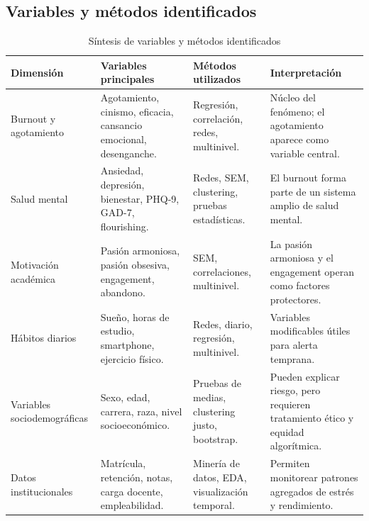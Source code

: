 \documentclass[12pt,a4paper]{article}
\renewcommand{\arraystretch}{1.12}
\begin{document}
\subsection{Variables y métodos identificados}

\begin{table}[H]
\centering
\caption{Síntesis de variables y métodos identificados}
\label{tab:variables_metodos}
\renewcommand{\arraystretch}{1.15}
\scriptsize

\begin{tabularx}{\textwidth}{|
>{\raggedright\arraybackslash}p{}|
>{\raggedright\arraybackslash}p{}|
>{\raggedright\arraybackslash}p{}|
>{\raggedright\arraybackslash}X|}
\hline

\textbf{Dimensión} &
\textbf{Variables principales} &
\textbf{Métodos utilizados} &
\textbf{Interpretación} \\
\hline

Burnout y agotamiento &
Agotamiento, cinismo, eficacia, cansancio emocional, desenganche. &
Regresión, correlación, redes, multinivel. &
Núcleo del fenómeno; el agotamiento aparece como variable central. \\
\hline

Salud mental &
Ansiedad, depresión, bienestar, PHQ-9, GAD-7, flourishing. &
Redes, SEM, clustering, pruebas estadísticas. &
El burnout forma parte de un sistema amplio de salud mental. \\
\hline

Motivación académica &
Pasión armoniosa, pasión obsesiva, engagement, abandono. &
SEM, correlaciones, multinivel. &
La pasión armoniosa y el engagement operan como factores protectores. \\
\hline

Hábitos diarios &
Sueño, horas de estudio, smartphone, ejercicio físico. &
Redes, diario, regresión, multinivel. &
Variables modificables útiles para alerta temprana. \\
\hline

Variables sociodemográficas &
Sexo, edad, carrera, raza, nivel socioeconómico. &
Pruebas de medias, clustering justo, bootstrap. &
Pueden explicar riesgo, pero requieren tratamiento ético y equidad algorítmica. \\
\hline

Datos institucionales &
Matrícula, retención, notas, carga docente, empleabilidad. &
Minería de datos, EDA, visualización temporal. &
Permiten monitorear patrones agregados de estrés y rendimiento. \\
\hline

\end{tabularx}
\end{table}
\end{document}
